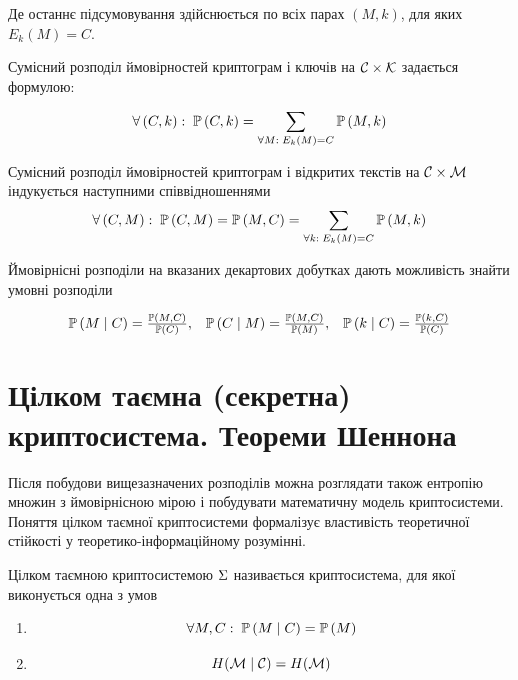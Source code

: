 Де останнє підсумовування здійснюється по всіх парах
$\left( M, k \right)$, для яких $E_k\left( M \right) = C$.

Сумісний розподіл ймовірностей криптограм і ключів на
$\mathcal{C} \times \mathcal{K}$ задається формулою:

$$\forall \left( C, k \right):\; \mathbb{P}\left( C, k \right)
        = \sum_{\forall M:\;E_k\left( M \right) = C} \mathbb{P}\left( M, k \right)$$


Сумісний розподіл ймовірностей криптограм і відкритих текстів на
$\mathcal{C} \times \mathcal{M}$ індукується наступними співвідношеннями
\begin{equation}\label{eq:jointDistributionMC}
    \forall \left( C, M \right):\; \mathbb{P}\left( C, M \right) = \mathbb{P}\left( M, C \right)
            = \sum_{\forall k:\;E_k\left( M \right) = C} \mathbb{P}\left( M, k \right)
\end{equation}


Ймовірнісні розподіли на вказаних декартових добутках дають можливість знайти
умовні розподіли

$$\begin{array}{lcr}
    \mathbb{P}\left( M \;\middle|\; C \right) = \frac{\mathbb{P}\left( M, C \right)}{\mathbb{P}\left( C \right)}, &
    \mathbb{P}\left( C \;\middle|\; M \right) = \frac{\mathbb{P}\left( M, C \right)}{\mathbb{P}\left( M \right)}, &
    \mathbb{P}\left( k \;\middle|\; C \right) = \frac{\mathbb{P}\left( k, C \right)}{\mathbb{P}\left( C \right)}
\end{array}$$


\section{Цілком таємна (секретна)  криптосистема. Теореми  Шеннона}

Після побудови вищезазначених розподілів можна розглядати також  ентропію множин
з ймовірнісною мірою і побудувати математичну модель криптосистеми. Поняття
цілком таємної криптосистеми формалізує властивість теоретичної стійкості у
теоретико-інформаційному розумінні.

\begin{definition}
    Цілком таємною криптосистемою $\Sigma$ називається криптосистема,
    для якої виконується одна з умов
    \begin{enumerate}
        \item\label{item:protectedCS:mc}
            $$\forall M, C:\; \mathbb{P}\left( M \;\middle|\; C \right) = \mathbb{P}\left( M \right)$$
        \item\label{item:protectedCS:MC}
            $$H\!\left( \mathcal{M} \;\middle|\; \mathcal{C} \right)
                = H\!\left( \mathcal{M} \right)$$
    \end{enumerate}
\end{definition}

